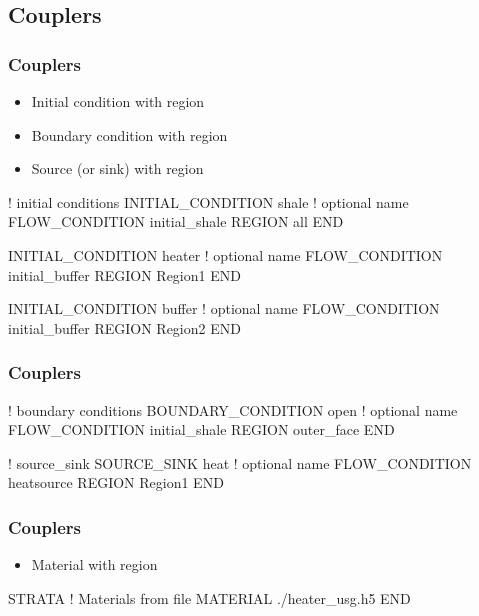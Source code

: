 \documentclass{beamer}
\newcommand\bluecomment[1]{{{\color{blue} #1}}}
\begin{document}
\subsection{Couplers}

\begin{frame}[fragile]\frametitle{Couplers}

\begin{itemize}
  \item Initial condition with region
  \item Boundary condition with region
  \item Source (or sink) with region
\end{itemize}

\begin{semiverbatim}\small
\bluecomment{! initial conditions}
INITIAL_CONDITION shale \bluecomment{! optional name}
  FLOW_CONDITION initial_shale
  REGION all
END

INITIAL_CONDITION heater \bluecomment{! optional name}
  FLOW_CONDITION initial_buffer
  REGION Region1
END

INITIAL_CONDITION buffer \bluecomment{! optional name}
  FLOW_CONDITION initial_buffer
  REGION Region2
END
\end{semiverbatim}
\end{frame}

\begin{frame}[fragile]\frametitle{Couplers}
\begin{semiverbatim}\small
\bluecomment{! boundary conditions}
BOUNDARY_CONDITION open \bluecomment{! optional name}
  FLOW_CONDITION initial_shale
  REGION outer_face
END

\bluecomment{! source_sink }
SOURCE_SINK heat \bluecomment{! optional name}
  FLOW_CONDITION heatsource
  REGION Region1
END
\end{semiverbatim}
\end{frame}

\begin{frame}[fragile]\frametitle{Couplers}
\begin{itemize}
  \item{Material with region}
\end{itemize}

\begin{semiverbatim}
STRATA \bluecomment{! Materials from file}
  MATERIAL ./heater_usg.h5
END
\end{semiverbatim}
\end{frame}
\end{document}
